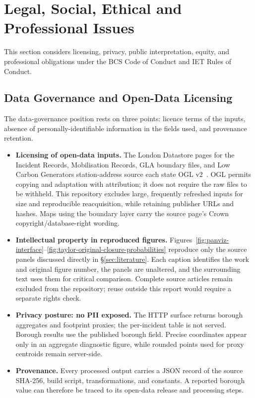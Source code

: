 \section{Legal, Social, Ethical and Professional Issues}

This section considers licensing, privacy, public interpretation, equity, and professional obligations under the BCS Code of Conduct and IET Rules of Conduct.

\subsection{Data Governance and Open-Data Licensing}

The data-governance position rests on three points: licence terms of the inputs, absence of personally-identifiable information in the fields used, and provenance retention.

\begin{itemize}
    \item \textbf{Licensing of open-data inputs.} The London Datastore pages for the Incident Records, Mobilisation Records, GLA boundary files, and Low Carbon Generators station-address source each state OGL v2~\cite{lfb_incidents,lfb_mobilisations,ons_boundaries,lfb_stations}. OGL permits copying and adaptation with attribution; it does not require the raw files to be withheld. This repository excludes large, frequently refreshed inputs for size and reproducible reacquisition, while retaining publisher URLs and hashes. Maps using the boundary layer carry the source page's Crown copyright/database-right wording.
    \item \textbf{Intellectual property in reproduced figures.} Figures~\ref{fig:panviz-interface}--\ref{fig:taylor-original-closure-probabilities} reproduce only the source panels discussed directly in \S\ref{sec:literature}. Each caption identifies the work and original figure number, the panels are unaltered, and the surrounding text uses them for critical comparison. Complete source articles remain excluded from the repository; reuse outside this report would require a separate rights check.
    \item \textbf{Privacy posture: no PII exposed.} The HTTP surface returns borough aggregates and footprint proxies; the per-incident table is not served. Borough results use the published borough field. Precise coordinates appear only in an aggregate diagnostic figure, while rounded points used for proxy centroids remain server-side.
    \item \textbf{Provenance.} Every processed output carries a JSON record of the source SHA-256, build script, transformations, and constants. A reported borough value can therefore be traced to its open-data release and processing steps.
\end{itemize}

